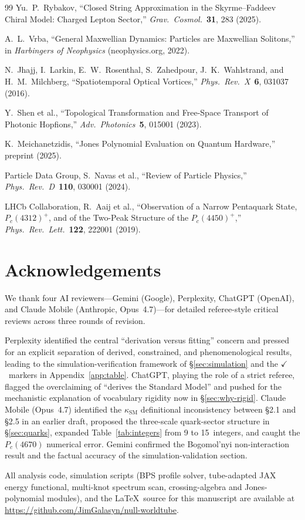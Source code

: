 \documentclass[11pt]{article}
\newcommand{\ksm}{\kappa_\text{SM}}
\begin{document}
\begin{thebibliography}{99}
Yu.~P.~Rybakov,
``Closed String Approximation in the Skyrme--Faddeev Chiral Model:
Charged Lepton Sector,''
\emph{Grav.\ Cosmol.}\ \textbf{31}, 283 (2025).

A.~L.~Vrba,
``General Maxwellian Dynamics: Particles are Maxwellian Solitons,''
in \emph{Harbingers of Neophysics} (neophysics.org, 2022).

N.~Jhajj, I.~Larkin, E.~W.~Rosenthal, S.~Zahedpour,
J.~K.~Wahlstrand, and H.~M.~Milchberg,
``Spatiotemporal Optical Vortices,''
\emph{Phys.\ Rev.\ X}\ \textbf{6}, 031037 (2016).

Y.~Shen et al.,
``Topological Transformation and Free-Space Transport of Photonic
Hopfions,''
\emph{Adv.\ Photonics}\ \textbf{5}, 015001 (2023).

K.~Meichanetzidis,
``Jones Polynomial Evaluation on Quantum Hardware,''
preprint (2025).


Particle Data Group, S.~Navas et al.,
``Review of Particle Physics,''
\emph{Phys.\ Rev.\ D}\ \textbf{110}, 030001 (2024).

LHCb Collaboration, R.~Aaij et al.,
``Observation of a Narrow Pentaquark State, $P_c(4312)^+$, and of
the Two-Peak Structure of the $P_c(4450)^+$,''
\emph{Phys.\ Rev.\ Lett.}\ \textbf{122}, 222001 (2019).

\end{thebibliography}

\section*{Acknowledgements}

We thank four AI reviewers---Gemini (Google), Perplexity, ChatGPT
(OpenAI), and Claude Mobile (Anthropic, Opus~4.7)---for detailed
referee-style critical reviews across three rounds of revision.

Perplexity identified the central ``derivation versus fitting''
concern and pressed for an explicit separation of derived,
constrained, and phenomenological results, leading to the
simulation-verification framework of \S\ref{sec:simulation} and
the $\checkmark$~markers in Appendix~\ref{app:table}.  ChatGPT,
playing the role of a strict referee, flagged the overclaiming of
``derives the Standard Model'' and pushed for the mechanistic
explanation of vocabulary rigidity now in \S\ref{sec:why-rigid}.
Claude Mobile (Opus~4.7) identified the $\ksm$ definitional
inconsistency between \S2.1 and \S2.5 in an earlier draft,
proposed the three-scale quark-sector structure in \S\ref{sec:quarks},
expanded Table~\ref{tab:integers} from 9 to 15~integers, and
caught the $P_c(4670)$ numerical error.  Gemini confirmed the
Bogomol'nyi non-interaction result and the factual accuracy of
the simulation-validation section.

All analysis code, simulation scripts (BPS profile solver,
tube-adapted JAX energy functional, multi-knot spectrum scan,
crossing-algebra and Jones-polynomial modules), and the \LaTeX\
source for this manuscript are available at
\url{https://github.com/JimGalasyn/null-worldtube}.
\end{document}

